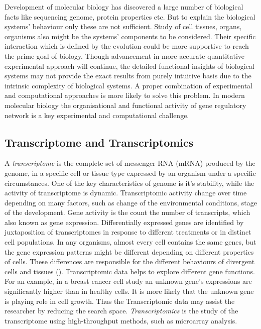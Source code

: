 Development of molecular biology has discovered a large number of biological facts like sequencing genome, protein properties etc. But to explain the biological systems' behaviour only these are not sufficient. Study of cell tissues, organs, organisms also might be the systems' components to be  considered. Their specific interaction which is defined by the evolution could be more supportive to reach the prime goal of biology. Though advancement in more accurate quantitative experimental approach will continue, the detailed functional insights of biological systems may not provide the exact results from purely intuitive basis due to the intrinsic complexity of biological systems. A proper combination of experimental and computational approaches is more likely to solve this problem. In modern molecular biology the organisational and functional activity of gene regulatory network is a key experimental and computational challenge.

\subsection{Transcriptome and Transcriptomics}
A \emph{transcriptome} is the complete set of messenger RNA (mRNA) produced by the genome, in a specific cell or tissue type expressed by an organism under a specific circumstances. One of the key characteristics of genome is it's stability, while the activity of transcriptome is dynamic. Transcriptomic activity change over time depending on many factors, such as change of the environmental conditions, stage of the development. Gene activity is the count the number of transcripts, which also known as gene expression. Differentially expressed genes are identified by juxtaposition of transcriptomes in response to different treatments or in distinct cell populations. In any organisms, almost every cell contains the same genes, but the gene expression patterns might be different depending on different properties of cells. These differences are responsible for the different behaviours of divergent cells and tissues (\cite{Adams:2008}). Transcriptomic data helps to explore different gene functions. For an example, in a breast cancer cell study an unknown gene's expressions are significantly higher than in healthy cells. It is more likely that the unknown gene is playing role in cell growth. Thus the Transcriptomic data may assist the researcher by reducing the search space. \emph{Transcriptomics} is the study of the transcriptome using high-throughput methods, such as microarray analysis.


